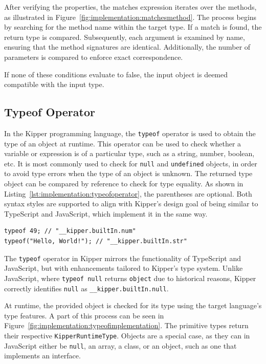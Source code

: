 After verifying the properties, the matches expression iterates over the methods, as illustrated in Figure~\ref{fig:implementation:matchesmethod}. The process begins by searching for the method name within the target type. If a match is found, the return type is compared. Subsequently, each argument is examined by name, ensuring that the method signatures are identical. Additionally, the number of parameters is compared to enforce exact correspondence.

If none of these conditions evaluate to false, the input object is deemed compatible with the input type.

\subsection{Typeof Operator}
\label{sec:typeof}

In the Kipper programming language, the \lstinline|typeof| operator is used to obtain the type of an object at runtime. This operator can be used to check whether a variable or expression is of a particular type, such as a string, number, boolean, etc. It is most commonly used to check for \lstinline|null| and \lstinline|undefined| objects, in order to avoid type errors when the type of an object is unknown. The returned type object can be compared by reference to check for type equality. As shown in Listing~\ref{lst:implementation:typeofoperator}, the parentheses are optional. Both syntax styles are supported to align with Kipper's design goal of being similar to TypeScript and JavaScript, which implement it in the same way.

\begin{lstlisting}[language=Kipper,caption=Typeof operator used to determine the type of an input expression,label=lst:implementation:typeofoperator]
typeof 49; // "__kipper.builtIn.num"
typeof("Hello, World!"); // "__kipper.builtIn.str"
\end{lstlisting}

The \lstinline|typeof| operator in Kipper mirrors the functionality of TypeScript and JavaScript, but with enhancements tailored to Kipper's type system. Unlike JavaScript, where \lstinline|typeof null| returns \lstinline|object| due to historical reasons, Kipper correctly identifies \lstinline|null| as \lstinline|__kipper.builtIn.null|.

At runtime, the provided object is checked for its type using the target language's type features. A part of this process can be seen in Figure~\ref{fig:implementation:typeofimplementation}. The primitive types return their respective \lstinline|KipperRuntimeType|. Objects are a special case, as they can in JavaScript either be \lstinline|null|, an array, a class, or an object, such as one that implements an interface.

